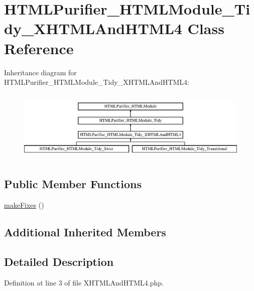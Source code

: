 \hypertarget{classHTMLPurifier__HTMLModule__Tidy__XHTMLAndHTML4}{\section{H\+T\+M\+L\+Purifier\+\_\+\+H\+T\+M\+L\+Module\+\_\+\+Tidy\+\_\+\+X\+H\+T\+M\+L\+And\+H\+T\+M\+L4 Class Reference}
\label{classHTMLPurifier__HTMLModule__Tidy__XHTMLAndHTML4}
}
Inheritance diagram for H\+T\+M\+L\+Purifier\+\_\+\+H\+T\+M\+L\+Module\+\_\+\+Tidy\+\_\+\+X\+H\+T\+M\+L\+And\+H\+T\+M\+L4\+:\begin{figure}[H]
\begin{center}
\leavevmode
\includegraphics[height=3.456790cm]{classHTMLPurifier__HTMLModule__Tidy__XHTMLAndHTML4}
\end{center}
\end{figure}
\subsection*{Public Member Functions}
\begin{DoxyCompactItemize}
\item 
\hyperlink{classHTMLPurifier__HTMLModule__Tidy__XHTMLAndHTML4_a3e34fe105f51a34bff4d861f03cd965e}{make\+Fixes} ()
\end{DoxyCompactItemize}
\subsection*{Additional Inherited Members}


\subsection{Detailed Description}


Definition at line 3 of file X\+H\+T\+M\+L\+And\+H\+T\+M\+L4.\+php.



